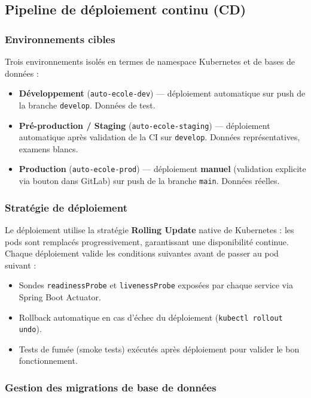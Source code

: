 \documentclass[12pt,a4paper]{article}
\newcommand{\role}[1]{\textbf{\color{accent}#1}}
\begin{document}
\subsection{Pipeline de déploiement continu (CD)}

\subsubsection{Environnements cibles}

Trois environnements isolés en termes de namespace Kubernetes et de bases de données :

\begin{itemize}[leftmargin=*,itemsep=4pt]
    \item \role{Développement} (\texttt{auto-ecole-dev}) --- déploiement automatique sur push de la branche \texttt{develop}. Données de test.
    \item \role{Pré-production / Staging} (\texttt{auto-ecole-staging}) --- déploiement automatique après validation de la CI sur \texttt{develop}. Données représentatives, examens blancs.
    \item \role{Production} (\texttt{auto-ecole-prod}) --- déploiement \textbf{manuel} (validation explicite via bouton dans GitLab) sur push de la branche \texttt{main}. Données réelles.
\end{itemize}

\subsubsection{Stratégie de déploiement}

Le déploiement utilise la stratégie \textbf{Rolling Update} native de Kubernetes : les pods sont remplacés progressivement, garantissant une disponibilité continue. Chaque déploiement valide les conditions suivantes avant de passer au pod suivant :

\begin{itemize}[leftmargin=*,itemsep=4pt]
    \item Sondes \texttt{readinessProbe} et \texttt{livenessProbe} exposées par chaque service via Spring Boot Actuator.
    \item Rollback automatique en cas d'échec du déploiement (\texttt{kubectl rollout undo}).
    \item Tests de fumée (smoke tests) exécutés après déploiement pour valider le bon fonctionnement.
\end{itemize}

\subsubsection{Gestion des migrations de base de données}
\end{document}
